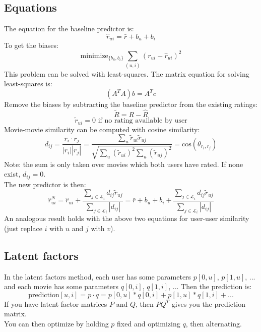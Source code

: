 \documentclass{article}
\newcommand{\MatrixVariable}[1]{\bm{\mathit{#1}}}
\begin{document}
\subsection{Equations}

The equation for the baseline predictor is:
$$\hat{r}_{ui} = \bar{r} + b_u + b_i$$
To get the biases:
$$\text{minimize}_{\lbrace b_u,b_i \rbrace} \sum_{(u,i)} (r_{ui} - \hat{r}_{ui})^2$$
This problem can be solved with least-squares. The matrix equation for solving least-squares is:
$$(\MatrixVariable{A}^T\MatrixVariable{A})\MatrixVariable{b} = \MatrixVariable{A}^T\MatrixVariable{c}$$
Remove the biases by subtracting the baseline predictor from the existing ratings:
$$\tilde{\MatrixVariable{R}} = \MatrixVariable{R} - \hat{\MatrixVariable{R}}$$
$$\tilde{r}_{ui} = 0 \text{ if no rating available by user}$$
Movie-movie similarity can be computed with cosine similarity:
$$d_{ij} = \frac{\MatrixVariable{r}_i \cdot \MatrixVariable{r}_j}{|\MatrixVariable{r}_i||\MatrixVariable{r}_j|} = \frac{\sum_u \tilde{r}_{ui} \tilde{r}_{uj}}{\sqrt{\sum_u (\tilde{r}_{ui})^2 \sum_u (\tilde{r}_{uj})^2}} = \text{cos}(\theta_{\MatrixVariable{r}_i,\MatrixVariable{r}_j}) $$
Note: the sum is only taken over movies which both users have rated. If none exist, $d_{ij} = 0$. \\
The new predictor is then:
$$\hat{r}_{ui}^N = \hat{r}_{ui} + \frac{\sum_{j \in \mathcal{L}_i} d_{ij} \tilde{r}_{uj}}{\sum_{j \in \mathcal{L}_i} |d_{ij}|} = \bar{r} + b_u + b_i + \frac{\sum_{j \in \mathcal{L}_i} d_{ij} \tilde{r}_{uj}}{\sum_{j \in \mathcal{L}_i} |d_{ij}|}$$
An analogous result holds with the above two equations for user-user similarity (just replace $i$ with $u$ and $j$ with $v$). \\

\subsection{Latent factors}
In the latent factors method, each user has some parameters $p[0,u]$, $p[1,u]$, ... and each movie has some parameters $q[0,i]$, $q[1,i]$, ... Then the prediction is:
$$\text{prediction}[u,i] = \MatrixVariable{p} \cdot \MatrixVariable{q} = p[0,u]*q[0,i] + p[1,u]*q[1,i] + ...$$
If you have latent factor matrices $\MatrixVariable{P}$ and $\MatrixVariable{Q}$, then $\MatrixVariable{P}\MatrixVariable{Q}^T$ gives you the prediction matrix. \\
You can then optimize by holding $\MatrixVariable{p}$ fixed and optimizing $\MatrixVariable{q}$, then alternating. \\
\end{document}
